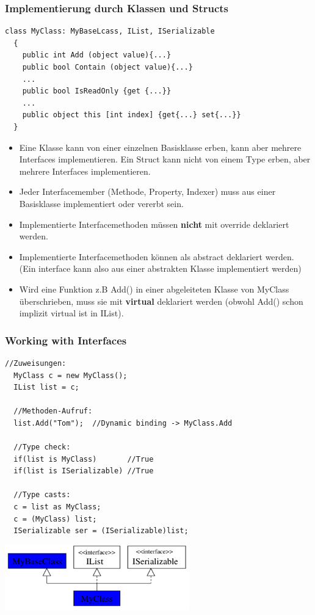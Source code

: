 \subsubsection{Implementierung durch Klassen und Structs}
\begin{lstlisting}[style=Csharp]
  class MyClass: MyBaseLcass, IList, ISerializable
  {
    public int Add (object value){...}
    public bool Contain (object value){...}
    ...
    public bool IsReadOnly {get {...}}
    ...
    public object this [int index] {get{...} set{...}}
  }
\end{lstlisting}
\begin{itemize}
	\item Eine Klasse kann von einer einzelnen Basisklasse erben, kann aber mehrere
	      Interfaces implementieren. Ein Struct kann nicht von einem Type erben, aber
	      mehrere Interfaces implementieren. 
	\item Jeder Interfacemember (Methode, Property, Indexer) muss aus einer
	      Basisklasse implementiert oder vererbt sein. 
	\item Implementierte Interfacemethoden müssen \textbf{nicht} mit override
	      deklariert werden. 
	\item Implementierte Interfacemethoden können als abstract deklariert werden.
	      (Ein interface kann also aus einer abstrakten Klasse implementiert werden)
	\item Wird eine Funktion z.B Add() in einer abgeleiteten Klasse von MyClass überschrieben,
	      muss sie mit \textbf{virtual} deklariert werden (obwohl Add() schon implizit virtual ist in IList).
\end{itemize}

\begin{multicols}{2}
\subsubsection{Working with Interfaces}
\begin{lstlisting}[style=Csharp]
  //Zuweisungen: 
  MyClass c = new MyClass(); 
  IList list = c; 
  
  //Methoden-Aufruf:
  list.Add("Tom");  //Dynamic binding -> MyClass.Add
  
  //Type check:
  if(list is MyClass)       //True
  if(list is ISerializable) //True
  
  //Type casts: 
  c = list as MyClass; 
  c = (MyClass) list; 
  ISerializable ser = (ISerializable)list;
\end{lstlisting}

\columnbreak

\includegraphics[width=8cm]{images/CSharp/Interface}

\end{multicols}

